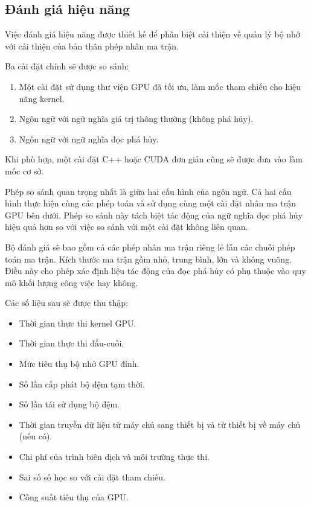 \documentclass[a4paper]{article}
\begin{document}
	
	\subsection{Đánh giá hiệu năng}
	
	Việc đánh giá hiệu năng được thiết kế để phân biệt cải thiện về quản lý bộ nhớ với cải thiện của bản thân phép nhân ma trận.
	
	Ba cài đặt chính sẽ được so sánh:
	
	\begin{enumerate}
		\item Một cài đặt sử dụng thư viện GPU đã tối ưu, làm mốc tham chiếu cho hiệu năng kernel.
		\item Ngôn ngữ với ngữ nghĩa giá trị thông thường (không phá hủy).
		\item Ngôn ngữ với ngữ nghĩa đọc phá hủy.
	\end{enumerate}
	
	Khi phù hợp, một cài đặt C++ hoặc CUDA đơn giản cũng sẽ được đưa vào làm mốc cơ sở.
	
	Phép so sánh quan trọng nhất là giữa hai cấu hình của ngôn ngữ. Cả hai cấu hình thực hiện cùng các phép toán và sử dụng cùng một cài đặt nhân ma trận GPU bên dưới. Phép so sánh này tách biệt tác động của ngữ nghĩa đọc phá hủy hiệu quả hơn so với việc so sánh với một cài đặt không liên quan.
	
	Bộ đánh giá sẽ bao gồm cả các phép nhân ma trận riêng lẻ lẫn các chuỗi phép toán ma trận. Kích thước ma trận gồm nhỏ, trung bình, lớn và không vuông. Điều này cho phép xác định liệu tác động của đọc phá hủy có phụ thuộc vào quy mô khối lượng công việc hay không.
	
	Các số liệu sau sẽ được thu thập:
	
	\begin{itemize}
		\item Thời gian thực thi kernel GPU.
		\item Thời gian thực thi đầu-cuối.
		\item Mức tiêu thụ bộ nhớ GPU đỉnh.
		\item Số lần cấp phát bộ đệm tạm thời.
		\item Số lần tái sử dụng bộ đệm.
		\item Thời gian truyền dữ liệu từ máy chủ sang thiết bị và từ thiết bị về máy chủ (nếu có).
		\item Chi phí của trình biên dịch và môi trường thực thi.
		\item Sai số số học so với cài đặt tham chiếu.
		\item Công suất tiêu thụ của GPU.
	\end{itemize}
	
\end{document}

